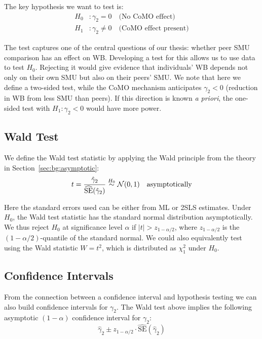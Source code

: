 The key hypothesis we want to test is:
\begin{align}
    H_0&: \gamma_2 = 0 \quad \text{(No CoMO effect)} \\
    H_1&: \gamma_2 \neq 0 \quad \text{(CoMO effect present)}
\end{align}

The test captures one of the central questions of our thesis: whether peer SMU comparison has an effect on WB\@. Developing a test for this allows us to use data to test $H_0$. Rejecting it would give evidence that individuals' WB depends not only on their own SMU but also on their peers' SMU\@. We note that here we define a two-sided test, while the CoMO mechanism anticipates $\gamma_2 < 0$ (reduction in WB from less SMU than peers). If this direction is known \emph{a priori}, the one-sided test with $H_1\!: \gamma_2 < 0$ would have more power.

\subsection{Wald Test}

We define the Wald test statistic by applying the Wald principle from the theory in Section~\ref{sec:bg:asymptotic}:
\begin{equation}
    t = \frac{\hat\gamma_2}{\widehat{\text{SE}}(\hat\gamma_2)}
    \stackrel{H_0}{\sim} \mathcal{N}(0, 1) \quad \text{asymptotically}
\end{equation}

Here the standard errors used can be either from ML or 2SLS estimates. Under $H_0$, the Wald test statistic has the standard normal distribution asymptotically. We thus reject $H_0$ at significance level $\alpha$ if $|t| > z_{1-\alpha/2}$, where $z_{1-\alpha/2}$ is the $(1 - \alpha/2)$-quantile of the standard normal. We could also equivalently test using the Wald statistic $W = t^2$, which is distributed as $\chi^2_1$ under $H_0$.

\subsection{Confidence Intervals}

From the connection between a confidence interval and hypothesis testing we can also build confidence intervals for $\gamma_2$. The Wald test above implies the following asymptotic $(1-\alpha)$ confidence interval for $\gamma_2$:
\begin{equation}
    \hat\gamma_2 \pm z_{1-\alpha/2} \cdot \widehat{\text{SE}}(\hat\gamma_2)
\end{equation}

